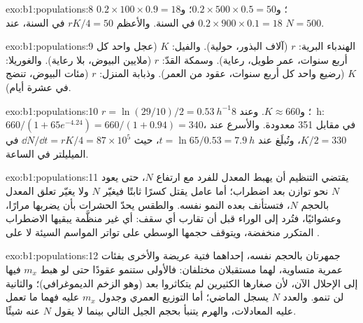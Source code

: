 \begin{solution}{exo:b1:populations:8}
$0.2\times 100\times 0.9 = 18$؛ و$0.2\times 500\times 0.5 = 50$؛
و$0.2\times 900\times 0.1 = 18$ في السنة. والأعظم $rK/4 = 50$ في السنة، عند
$N = 500$.
\end{solution}

\begin{solution}{exo:b1:populations:9}
الهندباء البرية: $r$ (آلاف البذور، حولية). والفيل: $K$ (عجل واحد
كل أربع سنوات، عمر طويل، رعاية). وسمكة القدّ: $r$ (ملايين البيوض، بلا رعاية).
والغوريلا: $K$ (رضيع واحد كل أربع سنوات، عقود من العمر). وذبابة المنزل: $r$
(مئات البيوض، تنضج في عشرة أيام).
\end{solution}

\begin{solution}{exo:b1:populations:10}
$r = \ln(29/10)/2 = \qty{0.53}{h^{-1}}$؛ و$K \approx 660$. وعند \qty{8}{h}:
$660/(1 + 65e^{-4.24}) = 660/(1 + 0.94) = 340$، في مقابل 351 معدودة.
والأسرع عند $K/2 = 330$، وتُبلَغ عند $t = \ln 65/0.53 = \qty{7.9}{h}$،
حيث $\dd N/\dd t = rK/4 = 87\times 10^5$  في الميليلتر في
الساعة.
\end{solution}

\begin{solution}{exo:b1:populations:11}
يقتضي التنظيم أن يهبط المعدل للفرد مع ارتفاع $N$، حتى يعود
$N$ نحو توازن بعد اضطراب؛ أما عامل يقتل كسرًا ثابتًا فيغيّر
$N$ ولا يغيّر تعلق المعدل بالحجم $N$، فتستأنف  بعده النمو نفسه.
والطقس يحدّ الحشرات بأن يضربها مرارًا، وعشوائيًا، فتُرد  إلى
الوراء قبل أن تقارب أي سقف: أي  غير منظَّمة يبقيها الاضطراب
المتكرر منخفضة، ويتوقف حجمها الوسطي على تواتر المواسم السيئة لا
على .
\end{solution}

\begin{solution}{exo:b1:populations:12}
جمهرتان بالحجم نفسه، إحداهما  فتية عريضة والأخرى بفئات
عمرية متساوية، لهما مستقبلان مختلفان: فالأولى ستنمو عقودًا حتى لو
هبط $m_x$ فيها إلى الإحلال الآن، لأن صغارها الكثيرين لم يتكاثروا
بعد (وهو الزخم الديموغرافي)؛ والثانية لن تنمو. والعدد $N$ يسجل الماضي؛
أما التوزيع العمري وجدول $m_x$ عليه فهما ما تعمل عليه المعادلات،
والهرم يتنبأ بحجم الجيل التالي بينما لا يقول $N$ عنه شيئًا.
\end{solution}

